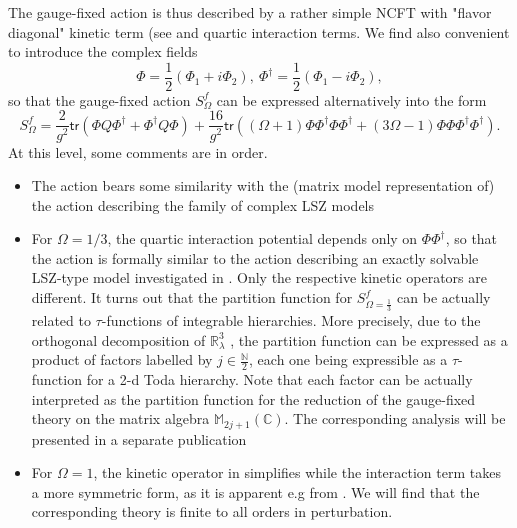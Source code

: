 \documentclass[10pt]{book}
\newcommand{\tr}{\mathsf{tr}}
\theoremstyle{break}
\begin{document}
%
The gauge-fixed action %
is thus described by a rather simple NCFT with "flavor diagonal" kinetic term (see %
and quartic interaction terms. We find also convenient to introduce the complex fields%
%
\begin{equation*}
\Phi=\frac{1}{2}(\Phi_1+i\Phi_2),\ \Phi^\dag=\frac{1}{2}(\Phi_1-i\Phi_2),
\end{equation*}
%
so that the gauge-fixed action $S^f_\Omega$ can be expressed alternatively into the form%
%
\begin{equation*}
S^f_\Omega = \frac{2}{g^2} \tr\left( \Phi Q \Phi^\dag + \Phi^\dag Q\Phi \right) + \frac{16}{g^2} \tr\left( (\Omega+1) \Phi\Phi^\dag\Phi\Phi^\dag + (3\Omega-1) \Phi\Phi\Phi^\dag\Phi^\dag \right) .
\end{equation*}
%
At this level, some comments are in order.
\begin{itemize}
%
\item The action %
bears some similarity with the (matrix model representation of) the action describing the family of complex LSZ models %

\item For $\Omega=1/3$, the quartic interaction potential depends only on $\Phi\Phi^\dag$, so that the action is formally similar to the action describing an exactly solvable LSZ-type model investigated in %
. Only the respective kinetic operators are different. It turns out that the partition function for $S^f_{\Omega=\frac{1}{3}}$ %
can be actually related to $\tau$-functions of integrable hierarchies. More precisely, due to the orthogonal decomposition of $\mathbb{R}^3_\lambda$ 
, the partition function can be expressed as a product of factors labelled by $j\in\frac{\mathbb{N}}{2}$, each one being expressible as a $\tau$-function for a 2-d Toda hierarchy. Note that each factor can be actually interpreted as the partition function for the reduction of the gauge-fixed theory %
on the matrix algebra $\mathbb{M}_{2j+1}(\mathbb{C})$. The corresponding analysis will be presented in a separate publication %

\item For $\Omega=1$, the kinetic operator in %
simplifies while the interaction term takes a more symmetric form, as it is apparent e.g from %
. We will find that the corresponding theory is finite to all orders in perturbation.%
%
\end{itemize}
\end{document}
